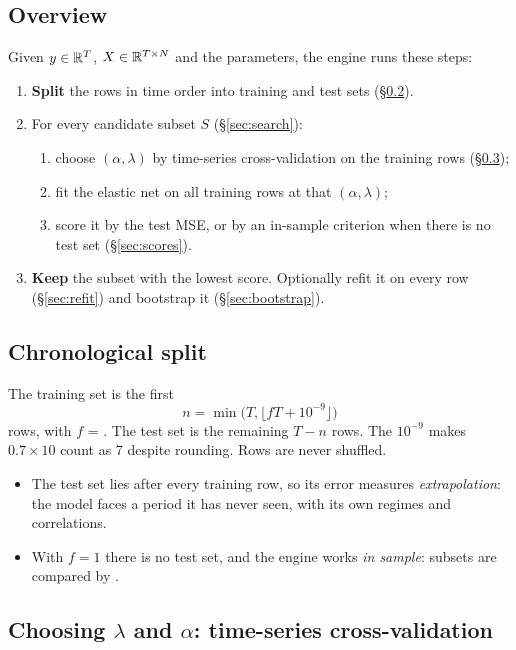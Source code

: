 \documentclass[11pt,a4paper]{article}
\begin{document}
\subsection{Overview}
Given $y\in\mathbb{R}^T$, $X\in\mathbb{R}^{T\times N}$ and the parameters, the engine runs these steps:
\begin{enumerate}
  \item \textbf{Split} the rows in time order into training and test sets (\S\ref{sec:split}).
  \item For every candidate subset $S$ (\S\ref{sec:search}):
  \begin{enumerate}
    \item choose $(\alpha,\lambda)$ by time-series cross-validation on the training rows
          (\S\ref{sec:cv});
    \item fit the elastic net on all training rows at that $(\alpha,\lambda)$;
    \item score it by the test MSE, or by an in-sample criterion when there is no test set
          (\S\ref{sec:scores}).
  \end{enumerate}
  \item \textbf{Keep} the subset with the lowest score. Optionally refit it on every row
        (\S\ref{sec:refit}) and bootstrap it (\S\ref{sec:bootstrap}).
\end{enumerate}

\subsection{Chronological split}\label{sec:split}
The training set is the first
\[
  n=\min\big(T,\lfloor fT+10^{-9}\rfloor\big)
\]
rows, with $f$ = . The test set is the remaining $T-n$ rows. The
$10^{-9}$ makes $0.7\times10$ count as 7 despite rounding. Rows are never shuffled.
\begin{itemize}
  \item The test set lies after every training row, so its error measures
        \emph{extrapolation}: the model faces a period it has never seen, with its own
        regimes and correlations.
  \item With $f=1$ there is no test set, and the engine works \emph{in sample}: subsets are
        compared by .
\end{itemize}

\subsection{\texorpdfstring{Choosing $\lambda$ and $\alpha$}{Choosing lambda and alpha}: time-series cross-validation}\label{sec:cv}
\end{document}
